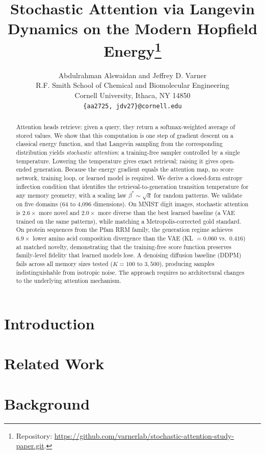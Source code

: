 \documentclass{article}
\title{Stochastic Attention via Langevin Dynamics on the Modern Hopfield Energy\thanks{Repository: \url{https://github.com/varnerlab/stochastic-attention-study-paper.git}.}}
\author{%
  Abdulrahman Alswaidan and Jeffrey D. Varner \\
  R.F. Smith School of Chemical and Biomolecular Engineering\\
  Cornell University, Ithaca, NY 14850 \\
  \texttt{\{aa2725, jdv27\}@cornell.edu} \\
}
\theoremstyle{definition}
\theoremstyle{remark}
\begin{document}
\maketitle

\begin{abstract}
Attention heads retrieve: given a query, they return a softmax-weighted average of stored values. We show that this computation is one step of gradient descent on a classical energy function, and that Langevin sampling from the corresponding distribution yields \emph{stochastic attention}: a training-free sampler controlled by a single temperature. Lowering the temperature gives exact retrieval; raising it gives open-ended generation. Because the energy gradient equals the attention map, no score network, training loop, or learned model is required. We derive a closed-form entropy inflection condition that identifies the retrieval-to-generation transition temperature for any memory geometry, with a scaling law $\beta^*\!\sim\!\sqrt{d}$ for random patterns. We validate on five domains (64 to 4,096 dimensions). On MNIST digit images, stochastic attention is $2.6{\times}$ more novel and $2.0{\times}$ more diverse than the best learned baseline (a VAE trained on the same patterns), while matching a Metropolis-corrected gold standard. On protein sequences from the Pfam RRM family, the generation regime achieves $6.9{\times}$ lower amino acid composition divergence than the VAE (KL $= 0.060$ vs.\ $0.416$) at matched novelty, demonstrating that the training-free score function preserves family-level fidelity that learned models lose. A denoising diffusion baseline (DDPM) fails across all memory sizes tested ($K = 100$ to $3{,}500$), producing samples indistinguishable from isotropic noise. The approach requires no architectural changes to the underlying attention mechanism.
\end{abstract}


\section{Introduction}


\section{Related Work}


\section{Background}

\end{document}

